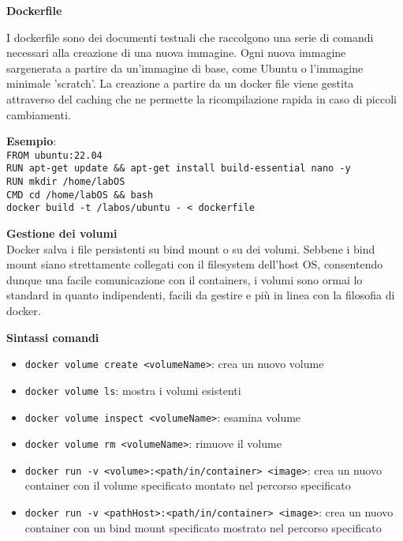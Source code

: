 \begin{flushleft}
  \textbf{Dockerfile} \par 
  I dockerfile sono dei documenti testuali che raccolgono una serie di comandi 
  necessari alla creazione di una nuova immagine. Ogni nuova immagine sar\aca generata 
  a partire da un'immagine di base, come Ubuntu o l'immagine minimale 'scratch'. La 
  creazione a partire da un docker file viene gestita attraverso del caching che ne 
  permette la ricompilazione rapida in caso di piccoli cambiamenti.\\
  \begin{flushleft}
    \textbf{Esempio}:\\
    \texttt{FROM ubuntu:22.04 \\ 
      RUN apt-get update \&\& apt-get install build-essential nano -y\\
      RUN mkdir /home/labOS \\
      CMD cd /home/labOS \&\& bash
    }\\
    \texttt{docker build -t /labos/ubuntu - < dockerfile}
  \end{flushleft}
\end{flushleft}
\begin{flushleft}
  \textbf{Gestione dei volumi}\\
  Docker salva i file persistenti su bind mount o su dei volumi. Sebbene i bind 
  mount siano strettamente collegati con il filesystem dell'host OS, consentendo 
  dunque una facile comunicazione con il containers, i volumi sono ormai lo standard 
  in quanto indipendenti, facili da gestire e più in linea con la filosofia di docker.
  \begin{flushleft}
    \textbf{Sintassi comandi}
    \begin{itemize}
      \item \texttt{docker volume create <volumeName>}: crea un nuovo volume
      \item \texttt{docker volume ls}: mostra i volumi esistenti
      \item \texttt{docker volume inspect <volumeName>}: esamina volume
      \item \texttt{docker volume rm <volumeName>}: rimuove il volume
      \item \texttt{docker run -v <volume>:<path/in/container> <image>}: crea un 
            nuovo container con il volume specificato montato nel percorso specificato
      \item \texttt{docker run -v <pathHost>:<path/in/container> <image>}: crea un nuovo container
            con un bind mount specificato mostrato nel percorso specificato
    \end{itemize}
  \end{flushleft}
\end{flushleft}
